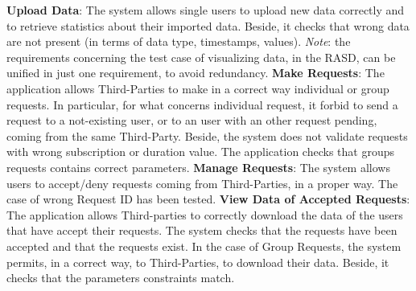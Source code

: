 \documentclass[a4paper]{article}
\begin{document}
\textbf{Upload Data}:\newline
The system allows single users to upload new data correctly and to retrieve statistics about their imported data. Beside, it checks that wrong data  are not present (in terms of data type, timestamps, values).\newline
\textit{Note}: the requirements concerning the test case of visualizing data, in the RASD, can be unified in just one requirement, to avoid redundancy.\newline
 \newline\newline
\textbf{Make Requests}:\newline
The application allows Third-Parties to make in a correct way individual or group requests.\newline
In particular, for what concerns individual request, it forbid  to send a request to a not-existing user, or to an user with an other request pending, coming from the same Third-Party. Beside, the system does not validate requests with wrong subscription or duration value.\newline
The application checks that groups requests contains correct parameters.
\newline\newline
\textbf{Manage Requests}:\newline
The system allows users to accept/deny requests coming from Third-Parties, in a proper way. The case of wrong Request ID has been tested.
\newline\newline
\textbf{View Data of Accepted Requests}:\newline
The application allows Third-parties to correctly download the data of the users that have accept their requests. The system checks that the requests have been accepted and that the requests exist.
In the case of Group Requests, the system permits, in a correct way, to Third-Parties, to download their data. Beside, it checks that the parameters constraints match. 







\


\newpage
\end{document}
